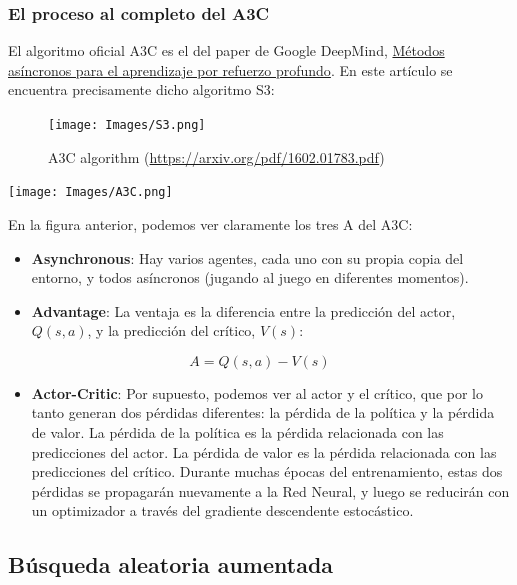 \documentclass[
]{book}
\providecommand{\tightlist}{%
  \setlength{\itemsep}{0pt}\setlength{\parskip}{0pt}}
\begin{document}
\hypertarget{el-proceso-al-completo-del-a3c}{%
\subsubsection{El proceso al completo del A3C}\label{el-proceso-al-completo-del-a3c}}

El algoritmo oficial A3C es el del paper de Google DeepMind, \href{https://arxiv.org/pdf/1602.01783.pdf}{Métodos asíncronos para el aprendizaje por refuerzo profundo}. En este artículo se encuentra precisamente dicho algoritmo S3:

\begin{figure}
\centering
\texttt{[image: Images/S3.png]}
\caption{A3C algorithm (\url{https://arxiv.org/pdf/1602.01783.pdf})}
\end{figure}

\texttt{[image: Images/A3C.png]}

En la figura anterior, podemos ver claramente los tres A del A3C:

\begin{itemize}
\item
  \textbf{Asynchronous}: Hay varios agentes, cada uno con su propia copia del entorno, y todos asíncronos (jugando al juego en diferentes momentos).
\item
  \textbf{Advantage}: La ventaja es la diferencia entre la predicción del actor, \(Q(s, a)\), y la predicción del crítico, \(V(s)\):
\end{itemize}

\[A = Q(s,a) - V(s)\]

\begin{itemize}
\tightlist
\item
  \textbf{Actor-Critic}: Por supuesto, podemos ver al actor y el crítico, que por lo tanto generan dos pérdidas diferentes: la pérdida de la política y la pérdida de valor. La pérdida de la política es la pérdida relacionada con las predicciones del actor. La pérdida de valor es la pérdida relacionada con las predicciones del crítico. Durante muchas épocas del entrenamiento, estas dos pérdidas se propagarán nuevamente a la Red Neural, y luego se reducirán con un optimizador a través del gradiente descendente estocástico.
\end{itemize}

\hypertarget{buxfasqueda-aleatoria-aumentada}{%
\subsection{Búsqueda aleatoria aumentada}\label{buxfasqueda-aleatoria-aumentada}}
\end{document}

